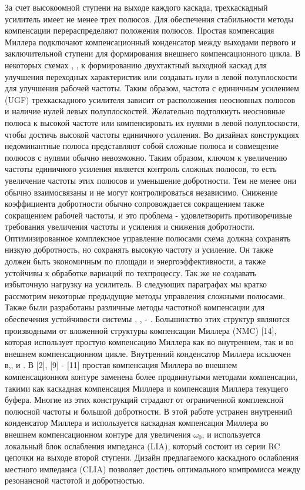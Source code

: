 \documentclass[a4paper,12pt]{article} %
\begin{document}
За счет высокоомной ступени на выходе каждого каскада,  трехкаскадный усилитель имеет не менее трех полюсов. Для обеспечения стабильности методы компенсации перераспределяют положения полюсов. Простая компенсация Миллера  подключают компенсационный конденсатор между выходами первого и заключительной ступени для формирования внешнего компенсационного цикла. В некоторых схемах \cite{op_amp_comp5}, \cite{op_amp_comp6}, \cite{op_amp_comp7} к формированию двухтактный выходной каскад для улучшения переходных характеристик или создавать нули в левой полуплоскости для улучшения рабочей частоты. Таким образом, частота с единичным усилением (UGF) трехкаскадного усилителя зависит от расположения неосновных полюсов и наличие нулей левых полуплоскостей. Желательно подтолкнуть неосновные полюса к высокой частоте или компенсировать их нулями в левой полуплоскости, чтобы достичь высокой частоты единичного усиления. Во  дизайнах конструкциях недоминантные полюса представляют собой сложные полюса и совмещение  полюсов с нулями обычно невозможно. Таким образом, ключом к увеличению частоты единичного усиления является контроль сложных полюсов, то есть увеличение частоты этих полюсов и уменьшение добротности. Тем не менее они обычно взаимосвязаны и не могут контролироваться независимо. Снижение коэффициента добротности  обычно сопровождается сокращением также сокращением рабочей частоты, и это проблема - удовлетворить противоречивые требования увеличения частоты и усиления и снижения добротности. Оптимизированное комплексное управление полюсами схема должна сохранять низкую добротность, но сохранять  высокую частоту и усиление. Он также должен быть экономичным по площади и энергоэффективности, а также устойчивы к обработке вариаций по техпроцессу. Так же не создавать избыточную нагрузку на усилитель. В следующих параграфах мы кратко рассмотрим некоторые предыдущие методы управления сложными полюсами.  Также были разработаны различные методы частотной компенсации для обеспечения устойчивости системы \cite{op_amp_comp2}, \cite{op_amp_comp3}, \cite{op_amp_comp4} - \cite{op_amp_comp1}. Большинство этих структур являются производными от вложенной структуры компенсации Миллера (NMC) [14], которая использует простую компенсацию Миллера как во внутреннем, так и во внешнем компенсационном цикле. Внутренний конденсатор Миллера исключен в\cite{op_amp_comp1},\cite{op_amp_comp3},\cite{op_amp_comp4} и \cite{op_amp_comp2} . В [2], [9] - [11] простая компенсация Миллера во внешнем компенсационном контуре заменена более продвинутыми методами компенсации, такими как каскадная компенсация Миллера и компенсация Миллера текущего буфера. Многие из этих конструкций страдают от ограниченной комплексной полюсной частоты и большой добротности. В этой работе устранен внутренний конденсатор Миллера и используется каскадная компенсация Миллера \cite{op_amp_comp10} во внешнем компенсационном контуре для увеличения $ \omega_0$, и используется локальный блок ослабления импеданса (LIA), который состоит из серии RC цепочки на выходе второй ступени. Дизайн предлагаемого каскадного ослабления местного импеданса (CLIA)  позволяет достичь оптимального компромисса между резонансной частотой и добротностью.
\end{document}
